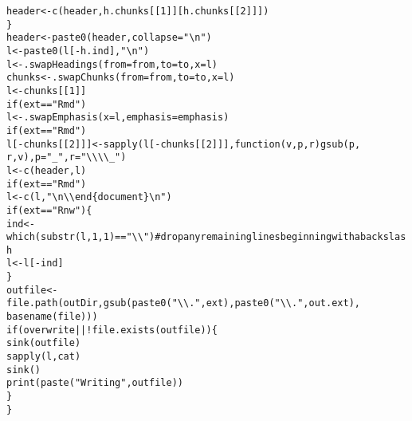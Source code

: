 \documentclass{article}\usepackage[]{graphicx}\usepackage[]{color}
\makeatletter
\newcommand{\hlnum}[1]{\textcolor[rgb]{0.863,0.196,0.184}{#1}}%
\newcommand{\hlstr}[1]{\textcolor[rgb]{0.863,0.196,0.184}{#1}}%
\newcommand{\hlcom}[1]{\textcolor[rgb]{0.345,0.431,0.459}{#1}}%
\newcommand{\hlopt}[1]{\textcolor[rgb]{0.576,0.631,0.631}{#1}}%
\newcommand{\hlstd}[1]{\textcolor[rgb]{0.514,0.58,0.588}{#1}}%
\newcommand{\hlkwa}[1]{\textcolor[rgb]{0.796,0.294,0.086}{#1}}%
\newcommand{\hlkwb}[1]{\textcolor[rgb]{0.522,0.6,0}{#1}}%
\newcommand{\hlkwc}[1]{\textcolor[rgb]{0.796,0.294,0.086}{#1}}%
\newcommand{\hlkwd}[1]{\textcolor[rgb]{0.576,0.631,0.631}{#1}}%
\newenvironment{kframe}{%
 \def\at@end@of@kframe{}%
 \ifinner\ifhmode%
  \def\at@end@of@kframe{\end{minipage}}%
  \begin{minipage}{\columnwidth}%
 \fi\fi%
 \def\FrameCommand##1{\hskip\@totalleftmargin \hskip-\fboxsep
 \colorbox{shadecolor}{##1}\hskip-\fboxsep
     \hskip-\linewidth \hskip-\@totalleftmargin \hskip\columnwidth}%
 \MakeFramed {\advance\hsize-\width
   \@totalleftmargin\z@ \linewidth\hsize
   \@setminipage}}%
 {\par\unskip\endMakeFramed%
 \at@end@of@kframe}
\newenvironment{knitrout}{}{} %
\makeatother
\begin{document}
\begin{knitrout}
\begin{kframe}
\begin{alltt}
        \hlstd{header} \hlkwb{<-} \hlkwd{c}\hlstd{(header, h.chunks[[}\hlnum{1}\hlstd{]][h.chunks[[}\hlnum{2}\hlstd{]]])}
    \hlstd{\}}
    \hlstd{header} \hlkwb{<-} \hlkwd{paste0}\hlstd{(header,} \hlkwc{collapse} \hlstd{=} \hlstr{"\textbackslash{}n"}\hlstd{)}
    \hlstd{l} \hlkwb{<-} \hlkwd{paste0}\hlstd{(l[}\hlopt{-}\hlstd{h.ind],} \hlstr{"\textbackslash{}n"}\hlstd{)}
    \hlstd{l} \hlkwb{<-} \hlkwd{.swapHeadings}\hlstd{(}\hlkwc{from} \hlstd{= from,} \hlkwc{to} \hlstd{= to,} \hlkwc{x} \hlstd{= l)}
    \hlstd{chunks} \hlkwb{<-} \hlkwd{.swapChunks}\hlstd{(}\hlkwc{from} \hlstd{= from,} \hlkwc{to} \hlstd{= to,} \hlkwc{x} \hlstd{= l)}
    \hlstd{l} \hlkwb{<-} \hlstd{chunks[[}\hlnum{1}\hlstd{]]}
    \hlkwa{if} \hlstd{(ext} \hlopt{==} \hlstr{"Rmd"}\hlstd{)}
        \hlstd{l} \hlkwb{<-} \hlkwd{.swapEmphasis}\hlstd{(}\hlkwc{x} \hlstd{= l,} \hlkwc{emphasis} \hlstd{= emphasis)}
    \hlkwa{if} \hlstd{(ext} \hlopt{==} \hlstr{"Rmd"}\hlstd{)}
        \hlstd{l[}\hlopt{-}\hlstd{chunks[[}\hlnum{2}\hlstd{]]]} \hlkwb{<-} \hlkwd{sapply}\hlstd{(l[}\hlopt{-}\hlstd{chunks[[}\hlnum{2}\hlstd{]]],} \hlkwa{function}\hlstd{(}\hlkwc{v}\hlstd{,} \hlkwc{p}\hlstd{,} \hlkwc{r}\hlstd{)} \hlkwd{gsub}\hlstd{(p,}
            \hlstd{r, v),} \hlkwc{p} \hlstd{=} \hlstr{"_"}\hlstd{,} \hlkwc{r} \hlstd{=} \hlstr{"\textbackslash{}\textbackslash{}\textbackslash{}\textbackslash{}_"}\hlstd{)}
    \hlstd{l} \hlkwb{<-} \hlkwd{c}\hlstd{(header, l)}
    \hlkwa{if} \hlstd{(ext} \hlopt{==} \hlstr{"Rmd"}\hlstd{)}
        \hlstd{l} \hlkwb{<-} \hlkwd{c}\hlstd{(l,} \hlstr{"\textbackslash{}n\textbackslash{}\textbackslash{}end\{document\}\textbackslash{}n"}\hlstd{)}
    \hlkwa{if} \hlstd{(ext} \hlopt{==} \hlstr{"Rnw"}\hlstd{) \{}
        \hlstd{ind} \hlkwb{<-} \hlkwd{which}\hlstd{(}\hlkwd{substr}\hlstd{(l,} \hlnum{1}\hlstd{,} \hlnum{1}\hlstd{)} \hlopt{==} \hlstr{"\textbackslash{}\textbackslash{}"}\hlstd{)}  \hlcom{# drop any remaining lines beginning with a backslash}
        \hlstd{l} \hlkwb{<-} \hlstd{l[}\hlopt{-}\hlstd{ind]}
    \hlstd{\}}
    \hlstd{outfile} \hlkwb{<-} \hlkwd{file.path}\hlstd{(outDir,} \hlkwd{gsub}\hlstd{(}\hlkwd{paste0}\hlstd{(}\hlstr{"\textbackslash{}\textbackslash{}."}\hlstd{, ext),} \hlkwd{paste0}\hlstd{(}\hlstr{"\textbackslash{}\textbackslash{}."}\hlstd{, out.ext),}
        \hlkwd{basename}\hlstd{(file)))}
    \hlkwa{if} \hlstd{(overwrite} \hlopt{|| !}\hlkwd{file.exists}\hlstd{(outfile)) \{}
        \hlkwd{sink}\hlstd{(outfile)}
        \hlkwd{sapply}\hlstd{(l, cat)}
        \hlkwd{sink}\hlstd{()}
        \hlkwd{print}\hlstd{(}\hlkwd{paste}\hlstd{(}\hlstr{"Writing"}\hlstd{, outfile))}
    \hlstd{\}}
\hlstd{\}}
\end{alltt}
\end{kframe}
\end{knitrout}
\end{document}
